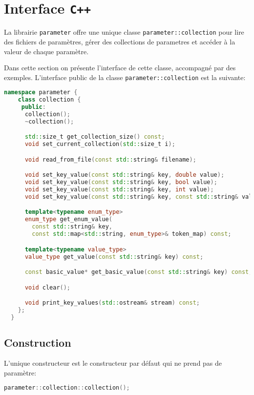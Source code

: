 \section{Interface \texttt{C++}}\label{sec:api}
La librairie \texttt{parameter} offre une unique classe
\texttt{parameter::collection} pour lire des fichiers de param\`etres,
g\'erer des collections de parametres et acc\'eder \`a la valeur de
chaque param\`etre.

Dans cette section on pr\'esente l'interface de cette classe,
accompagn\'e par des exemples. L'interface public de la classe
\texttt{parameter::collection} est la suivante:
\begin{lstlisting}[language=c++,frame=single,basicstyle=\ttfamily\footnotesize]
  namespace parameter {
    class collection {
     public:
      collection();
      ~collection();

      std::size_t get_collection_size() const;
      void set_current_collection(std::size_t i);

      void read_from_file(const std::string& filename);

      void set_key_value(const std::string& key, double value);
      void set_key_value(const std::string& key, bool value);
      void set_key_value(const std::string& key, int value);
      void set_key_value(const std::string& key, const std::string& value);

      template<typename enum_type>
      enum_type get_enum_value(
        const std::string& key,
        const std::map<std::string, enum_type>& token_map) const;

      template<typename value_type>
      value_type get_value(const std::string& key) const;

      const basic_value* get_basic_value(const std::string& key) const;

      void clear();

      void print_key_values(std::ostream& stream) const;
    };
  }
\end{lstlisting}

\subsection{Construction}
L'unique constructeur est le constructeur par d\'efaut qui ne prend
pas de param\`etre:
\begin{lstlisting}[language=c++,frame=single,basicstyle=\ttfamily\footnotesize]
  parameter::collection::collection();
\end{lstlisting}


